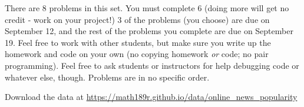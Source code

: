 \documentclass[12pt,letterpaper]{hmcpset}
\begin{document}
There are 8 problems in this set. You must complete 6 (doing more will get no
credit - work on your project!) 3 of the problems (you choose) are due on September 12,
and the rest of the problems you complete are due on September 19. Feel
free to work with other students, but make sure you write up the homework
and code on your own (no copying homework \textit{or} code; no pair programming).
Feel free to ask students or instructors for help debugging code or whatever else,
though. Problems are in no specific order.

\begin{problem}[1]
    Download the data at \url{https://math189r.github.io/data/online_news_popularity}
\end{problem}

\begin{solution}
    \vfill
\end{solution}
\clearpage
\end{document}
